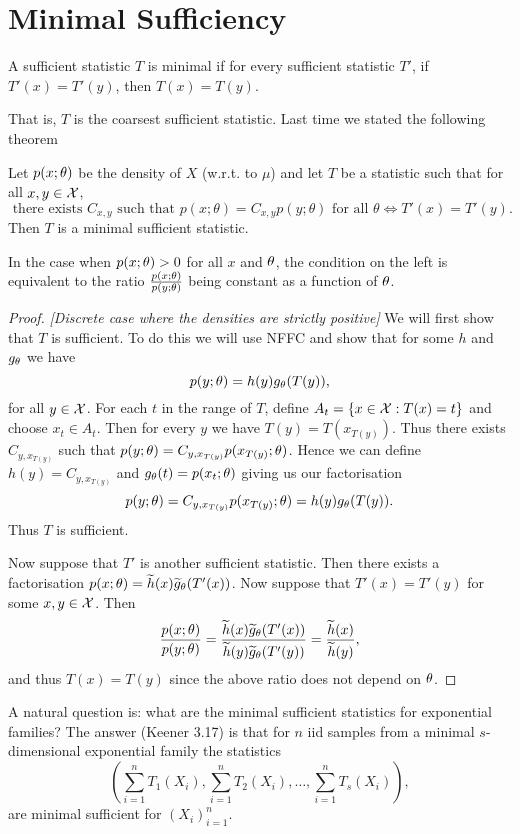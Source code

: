 \section{Minimal Sufficiency}
\begin{defn}
    A sufficient statistic $T$ is minimal if for every sufficient statistic $T'$, if $T'(x) = T'(y)$, then $T(x) = T(y)$.
\end{defn}
That is, $T$ is the coarsest sufficient statistic. Last time we stated the following theorem
\begin{thrm}
    Let $p(x;{\theta})$ be the density of $X$ (w.r.t. to $\mu$) and let $T$ be a statistic such that for all $x, y \in {\mathcal{X}}$, 
    \[\text{ there exists } C_{x,y} \text{ such that } p(x;\theta) = C_{x,y}p(y;\theta) \text{ for all }\theta \Longleftrightarrow T'(x) = T'(y). \]
    Then $T$ is a minimal sufficient statistic.
\end{thrm}
In the case when $p(x;{\theta}) > 0$ for all $x$ and ${\theta}$, the condition on the left is equivalent to the ratio $\frac{p(x;{\theta})}{p(y;{\theta})}$ being constant as a function of ${\theta}$.
\begin{proof}
    \emph{[Discrete case where the densities are strictly positive]} We will first show that $T$ is sufficient. To do this we will use NFFC and show that for some $h$ and $g_{\theta}$ we have
    \[p(y;{\theta}) = h(y)g_{\theta}(T(y)), \]
    for all $y \in {\mathcal{X}}$. For each $t$ in the range of $T$, define $A_t = \{x \in {\mathcal{X}} : T(x) = t\}$ and choose $x_t \in A_t$. Then for every $y$ we have $T(y) = T(x_{T(y)})$. Thus there exists $C_{y, x_{T(y)}}$ such that $p(y;{\theta}) = C_{y, x_{T(y)}}p(x_{T(y)}; {\theta})$. Hence we can define $h(y) = C_{y, x_{T(y)}}$ and $g_{\theta}(t) = p(x_t;{\theta})$ giving us our factorisation 
    \[p(y;{\theta}) = C_{y,x_{T(y)}}p(x_{T(y)};{\theta}) = h(y)g_{\theta}(T(y)).\] 
    Thus $T$ is sufficient.

    Now suppose that $T'$ is another sufficient statistic. Then there exists a factorisation $p(x;{\theta}) = \widetilde{h}(x)\widetilde{g}_{\theta}(T'(x))$. Now suppose that $T'(x) = T'(y)$ for some $x,y \in {\mathcal{X}}$. Then 
    \[\frac{p(x;{\theta})}{p(y;{\theta})} = \frac{\widetilde{h}(x)\widetilde{g}_{\theta}(T'(x))}{\widetilde{h}(y)\widetilde{g}_{\theta}(T'(y))} =\frac{\widetilde{h}(x)}{\widetilde{h}(y)}, \]
    and thus $T(x) = T(y)$ since the above ratio does not depend on ${\theta}$.
\end{proof}
\begin{ex}
    A natural question is: what are the minimal sufficient statistics for exponential families? The answer (Keener 3.17) is that for $n$ iid samples from a minimal $s$-dimensional exponential family the statistics
    \[\left(\sum_{i=1}^n T_1(X_i), \sum_{i=1}^n T_2(X_i),\ldots, \sum_{i=1}^n T_s(X_i)\right), \]
    are minimal sufficient for $(X_i)_{i=1}^n$.
\end{ex}   
